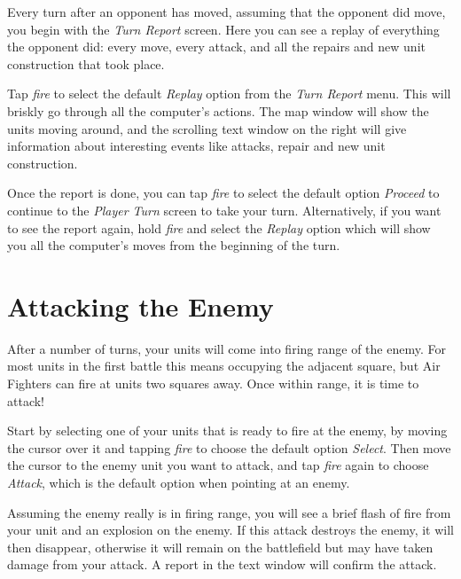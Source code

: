 Every turn after an opponent has moved, assuming that the opponent did move, you begin with the {\it Turn Report} screen. Here you can see a replay of everything the opponent did: every move, every attack, and all the repairs and new unit construction that took place.

Tap {\it fire} to select the default {\it Replay} option from the {\it Turn Report} menu. This will briskly go through all the computer's actions. The map window will show the units moving around, and the scrolling text window on the right will give information about interesting events like attacks, repair and new unit construction.

Once the report is done, you can tap {\it fire} to select the default option {\it Proceed} to continue to the {\it Player Turn} screen to take your turn. Alternatively, if you want to see the report again, hold {\it fire} and select the {\it Replay} option which will show you all the computer's moves from the beginning of the turn.

\section{Attacking the Enemy}

\noindent
After a number of turns, your units will come into firing range of the enemy. For most units in the first battle this means occupying the adjacent square, but Air Fighters can fire at units two squares away. Once within range, it is time to attack!

Start by selecting one of your units that is ready to fire at the enemy, by moving the cursor over it and tapping {\it fire} to choose the default option {\it Select}. Then move the cursor to the enemy unit you want to attack, and tap {\it fire} again to choose {\it Attack}, which is the default option when pointing at an enemy.

Assuming the enemy really is in firing range, you will see a brief flash of fire from your unit and an explosion on the enemy. If this attack destroys the enemy, it will then disappear, otherwise it will remain on the battlefield but may have taken damage from your attack. A report in the text window will confirm the attack.

